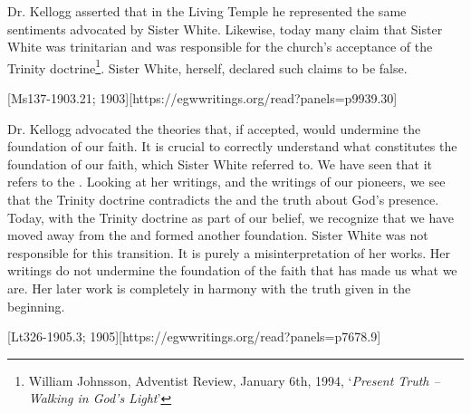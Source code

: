 
Dr. Kellogg asserted that in the Living Temple he represented the same sentiments advocated by Sister White. Likewise, today many claim that Sister White was trinitarian and was responsible for the church's acceptance of the Trinity doctrine\footnote{William Johnsson, Adventist Review, January 6th, 1994, ‘\textit{Present Truth –Walking in God’s Light}’}. Sister White, herself, declared such claims to be false.

[Ms137-1903.21; 1903][https://egwwritings.org/read?panels=p9939.30]

Dr. Kellogg advocated the theories that, if accepted, would undermine the foundation of our faith. It is crucial to correctly understand what constitutes the foundation of our faith, which Sister White referred to. We have seen that it refers to the . Looking at her writings, and the writings of our pioneers, we see that the Trinity doctrine contradicts the  and the truth about God’s presence. Today, with the Trinity doctrine as part of our belief, we recognize that we have moved away from the  and formed another foundation. Sister White was not responsible for this transition. It is purely a misinterpretation of her works. Her writings do not undermine the foundation of the faith that has made us what we are. Her later work is completely in harmony with the truth given in the beginning.

[Lt326-1905.3; 1905][https://egwwritings.org/read?panels=p7678.9]

